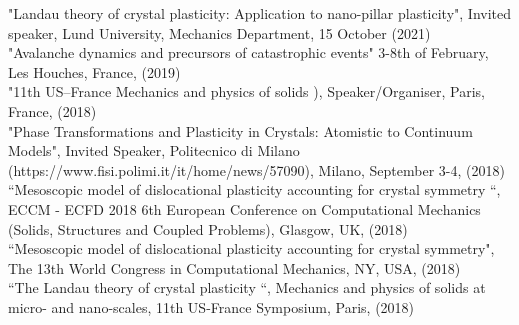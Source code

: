 \documentclass[paper=a4,fontsize=11pt]{temp} %
\begin{document}
"Landau theory of crystal plasticity: Application to nano-pillar plasticity", Invited speaker, Lund University, Mechanics Department,  15 October (2021)\\

"Avalanche dynamics and precursors of catastrophic events"
 3-8th of February, Les Houches, France, (2019)\\

"11th US–France Mechanics and physics of solids ), Speaker/Organiser, Paris, France, (2018)\\

"Phase Transformations and Plasticity in Crystals:
Atomistic to Continuum Models", Invited Speaker, Politecnico di Milano (https://www.fisi.polimi.it/it/home/news/57090), Milano, September 3-4, (2018)\\
 
“Mesoscopic model of dislocational plasticity accounting for crystal symmetry “, ECCM - ECFD 2018 6th European Conference on Computational Mechanics (Solids, Structures and Coupled Problems), Glasgow, UK, (2018)\\

“Mesoscopic model of dislocational plasticity accounting for crystal symmetry", The 13th World Congress in Computational Mechanics, NY, USA, (2018)\\

“The Landau theory of crystal plasticity  “, Mechanics and physics of solids at micro- and nano-scales, 11th US-France Symposium, Paris,  (2018)\\
\end{document}
